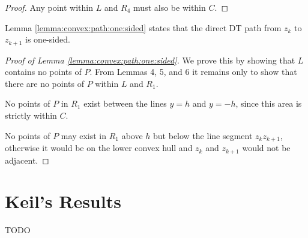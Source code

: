 \documentclass{tufte-handout}
\begin{document}
\begin{proof}

  Any point within $L$ and $R_4$ must also be within $C$.

\end{proof}

Lemma \ref{lemma:convex:path:one:sided} states that the direct DT path
from $z_k$ to $z_{k+1}$ is one-sided.
  
\begin{proof}[Proof of Lemma \ref{lemma:convex:path:one:sided}]

  We prove this by showing that $L$ contains no points of $P$.  From
  Lemmas 4, 5, and 6 it remains only to show that there are no points
  of $P$ within $L$ and $R_1$.

  No points of $P$ in $R_1$ exist between the lines $y=h$ and $y=-h$,
  since this area is strictly within $C$.

  No points of $P$ may exist in $R_1$ above $h$ but below the line
  segment $z_kz_{k+1}$, otherwise it would be on the lower convex hull
  and $z_k$ and $z_{k+1}$ would not be adjacent.

\end{proof}

\newpage
\part{Keil's Results}

TODO


\newpage

\end{document}
